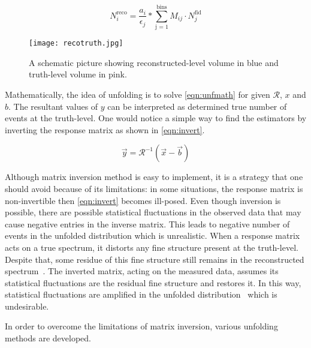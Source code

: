 \begin{equation}
    N_{i}^{\text{reco}} = \frac{a_i}{\epsilon_j} * \sum_{\text{j = 1}}^{\text{bins}} M_{ij} \cdot N_{j}^{\text{fid}} 
\end{equation}


\begin{figure}
    \centering
        \texttt{[image: recotruth.jpg]}
        \caption{A schematic picture showing reconstructed-level volume in blue and 
        truth-level volume in pink.}
           \label{fig:recotruth}
  \end{figure}

Mathematically, the idea of unfolding is to solve \cref{eqn:unfmath} for given 
$\mathcal{R}$, $x$ and $b$. The resultant values of $y$ can be interpreted as 
determined true number of events at the truth-level. One would notice a simple way to 
find the estimators by inverting the response matrix as shown in \cref{eqn:invert}.

\begin{equation}
    \vec{y} = \mathcal{R}^{-1} (\vec{x}-\vec{b})
    \label{eqn:invert}
\end{equation}

Although matrix inversion method is easy to implement, it is a strategy that one should 
avoid because of its limitations: in some situations, the response matrix is non-invertible
then \cref{eqn:invert} becomes ill-posed. Even though inversion is possible, there are possible
statistical fluctuations in the observed data that may cause negative entries in the 
inverse matrix. This leads to negative number of events in the unfolded distribution
which is unrealistic. When a response matrix acts on a true spectrum, it distorts any 
fine structure present at the truth-level. Despite that, some residue of this fine 
structure still remains in the reconstructed spectrum~\cite{cowan}. The inverted matrix, 
acting on the measured data, assumes its statistical fluctuations are the residual fine 
structure and restores it. In this way, statistical fluctuations are amplified in the unfolded
distribution~\cite{inverse} which is undesirable.

In order to overcome the limitations of matrix inversion, various unfolding methods are developed.